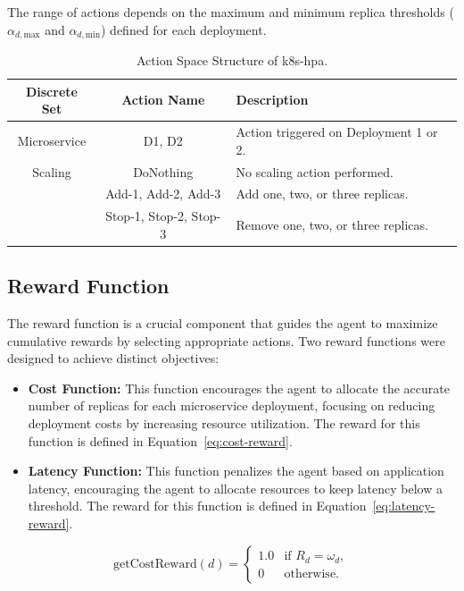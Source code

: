 \documentclass[conference]{IEEEtran}
\begin{document}
The range of actions depends on the maximum and minimum replica thresholds ($\alpha_{d,\text{max}}$ and $\alpha_{d,\text{min}}$) defined for each deployment.

\begin{table}[h]
    \centering
    \caption{Action Space Structure of k8s-hpa.}
    \label{tab:action-space}
    \begin{tabular}{|c|c|l|}
        \hline
        \textbf{Discrete Set} & \textbf{Action Name} & \textbf{Description} \\
        \hline
        Microservice & D1, D2 & Action triggered on Deployment 1 or 2. \\
        Scaling & DoNothing & No scaling action performed. \\
        & Add-1, Add-2, Add-3 & Add one, two, or three replicas. \\
        & Stop-1, Stop-2, Stop-3 & Remove one, two, or three replicas. \\
        \hline
    \end{tabular}
\end{table}

\subsection{Reward Function}

The reward function is a crucial component that guides the agent to maximize cumulative rewards by selecting appropriate actions. Two reward functions were designed to achieve distinct objectives:
\begin{itemize}
    \item \textbf{Cost Function:} This function encourages the agent to allocate the accurate number of replicas for each microservice deployment, focusing on reducing deployment costs by increasing resource utilization. The reward for this function is defined in Equation~\ref{eq:cost-reward}.
    \item \textbf{Latency Function:} This function penalizes the agent based on application latency, encouraging the agent to allocate resources to keep latency below a threshold. The reward for this function is defined in Equation~\ref{eq:latency-reward}.
\end{itemize}

\begin{equation}
    \text{getCostReward}(d) =
    \begin{cases} 
        1.0 & \text{if } R_d = \omega_d, \\
        0 & \text{otherwise.}
    \end{cases}
    \label{eq:cost-reward}
\end{equation}
\end{document}
